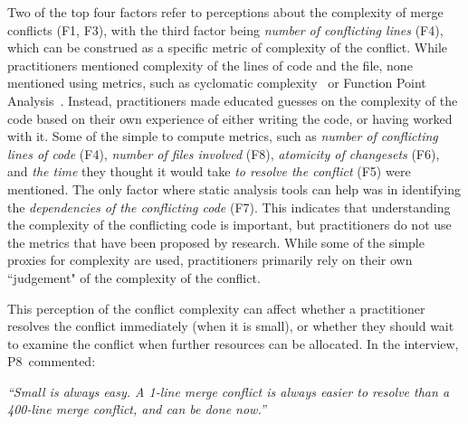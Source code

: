 \label{artifact-based-factors}
Two of the top four factors refer to perceptions about the complexity of merge conflicts (F1, F3), with the third factor being \textit{number of conflicting lines} (F4), which can be construed as a specific metric of complexity of the conflict. 
While practitioners mentioned complexity of the lines of code and the file, none mentioned using metrics, such as cyclomatic complexity~\cite{fenton2000quantitative}\cite{mccabe1976complexity} or Function Point Analysis~\cite{garmus2001fpa}\cite{symons1988function}. 
Instead, practitioners made educated guesses on the complexity of the code based on their own experience of either writing the code, or having worked with it. 
Some of the simple to compute metrics, such as \textit{number of conflicting lines of code} (F4), \textit{number of files involved} (F8), \textit{atomicity of changesets} (F6), and \textit{the time} they thought it would take \textit{to resolve the conflict} (F5) were mentioned. 
The only factor where static analysis tools can help was in identifying the \textit{dependencies of the conflicting code} (F7).
This indicates that understanding the complexity of the conflicting code is important, but practitioners do not use the metrics that have been proposed by research. While some of the simple proxies for complexity are used, practitioners primarily rely on their own ``judgement" of the complexity of the conflict.



This perception of the conflict complexity can affect whether a practitioner resolves the conflict immediately (when it is small), or whether they should wait to examine the conflict when further resources can be allocated.
In the interview, \mbox{P8 commented}:
\begin{displayquote}
\textit{``Small is always easy. A 1-line merge conflict is always easier to resolve than a 400-line merge conflict, and can be done now.''}
\end{displayquote}


